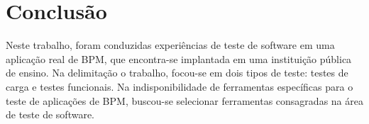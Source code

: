 \documentclass[12pt]{article}
\begin{document}




\section{Conclusão}
Neste trabalho, foram conduzidas experiências de teste de software em uma aplicação real de BPM, que encontra-se implantada em uma instituição pública de ensino. Na delimitação o trabalho, focou-se em dois tipos de teste: testes de carga e testes funcionais. Na indisponibilidade de ferramentas específicas para o teste de aplicações de BPM, buscou-se selecionar ferramentas consagradas na área de teste de software.
\end{document}
